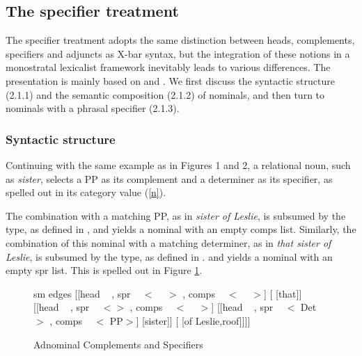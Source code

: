 \documentclass[output=paper]{langsci/langscibook}
\begin{document}
    
\subsection{The specifier treatment} 


The specifier treatment adopts the same distinction between heads, complements, 
specifiers and adjuncts as X-bar syntax, but the integration of these notions 
in a monostratal lexicalist framework inevitably leads to various differences. 
The presentation is mainly based on \citet{ps2} and \citet{GS00}. 
We first discuss the syntactic structure (2.1.1) and the semantic composition (2.1.2) 
of nominals, and then turn to nominals with a phrasal specifier (2.1.3). 


\subsubsection{Syntactic structure}


Continuing with the same example as in Figures 1 and 2, 
a relational noun, such as \emph{sister}, selects a PP as its complement 
and a determiner as its specifier, as spelled out in its {\sc category} value
(\ref{n}). 

\begin{exe} 
\ex\label{n}
\begin{avm}
\end{avm}
\end{exe}

\noindent
The combination with a matching PP, as in \emph{sister of Leslie},   
is subsumed by the  type, as defined in , 
and yields a nominal with an empty {\sc comps} list.  
Similarly, the combination of this nominal with a matching determiner, as in \emph{that sister of Leslie},    
is subsumed by the  type, as defined in . 
and yields a nominal with an empty {\sc spr} list. This is spelled out in Figure \ref{les}. 

\begin{figure}
	\centering
	\begin{forest}
sm edges
[{[{\sc head} ~   , {\sc spr} ~ $<$ ~ $>$ , {\sc comps} ~ $<$ ~ $>$]}
		[ [that]]
		[{[{\sc head} ~  , {\sc spr} ~ $<$$>$ , {\sc comps} ~ $<$ ~ $>$]} 
			[{[{\sc head} ~  , {\sc spr} ~ $<$ Det$>$ , {\sc comps} ~ $<$ PP$>$]} [sister]]
			[ [of Leslie,roof]]]]	
	\end{forest}
	\caption{\label{les} Adnominal Complements and Specifiers}
\end{figure}
\end{document}
